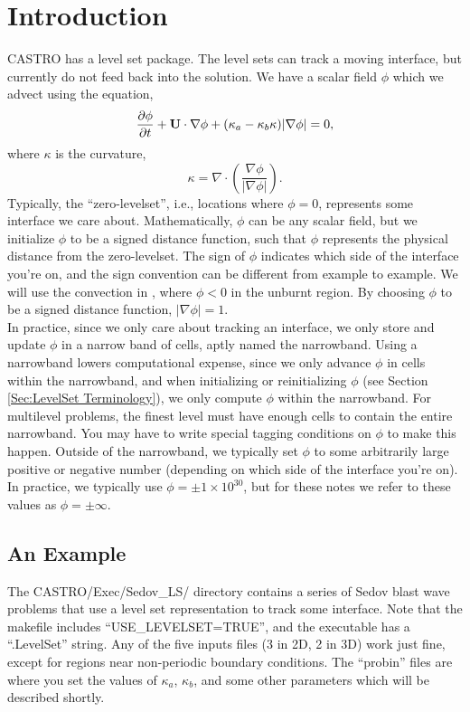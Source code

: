 \section{Introduction}
CASTRO has a level set package.  The level sets can track a moving interface, but currently do not feed back into the solution.  We have a scalar field $\phi$ which we advect using the equation,
\begin{equation}
\frac{\partial\phi}{\partial t} + {\bf U}\cdot\nabla\phi + (\kappa_a-\kappa_b\kappa)|\nabla\phi| = 0,
\end{equation}
where $\kappa$ is the curvature,
\begin{equation}
\kappa = \nabla\cdot\left(\frac{\nabla\phi}{|\nabla\phi|}\right).
\end{equation}
Typically, the ``zero-levelset'', i.e., locations where $\phi=0$, represents some interface we care about.  Mathematically, $\phi$ can be any scalar field, but we initialize $\phi$ to be a signed distance function, such that $\phi$ represents the physical distance from the zero-levelset.  The sign of $\phi$ indicates which side of the interface you're on, and the sign convention can be different from example to example.  We will use the convection in \cite{Reinecke99}, where $\phi < 0$ in the unburnt region.  By choosing $\phi$ to be a signed distance function, $|\nabla\phi|=1$.\\

In practice, since we only care about tracking an interface, we only store and update $\phi$ in a narrow band of cells, aptly named the narrowband.  Using a narrowband lowers computational expense, since we only advance $\phi$ in cells within the narrowband, and when initializing or reinitializing $\phi$ (see Section \ref{Sec:LevelSet Terminology}), we only compute $\phi$ within the narrowband.  For multilevel problems, the finest level must have enough cells to contain the entire narrowband.  You may have to write special tagging conditions on $\phi$ to make this happen.  Outside of the narrowband, we typically set $\phi$ to some arbitrarily large positive or negative number (depending on which side of the interface you're on).  In practice, we typically use $\phi=\pm 1\times 10^{30}$, but for these notes we refer to these values as $\phi=\pm\infty$.\\

\subsection{An Example}
The CASTRO/Exec/Sedov\_LS/ directory contains a series of Sedov blast wave problems that use a level set representation to track some interface.  Note that the makefile includes ``USE\_LEVELSET=TRUE'', and the executable has a ``.LevelSet'' string.  Any of the five inputs files (3 in 2D, 2 in 3D) work just fine, except for regions near non-periodic boundary conditions.  The ``probin'' files are where you set the values of $\kappa_a$, $\kappa_b$, and some other parameters which will be described shortly.

